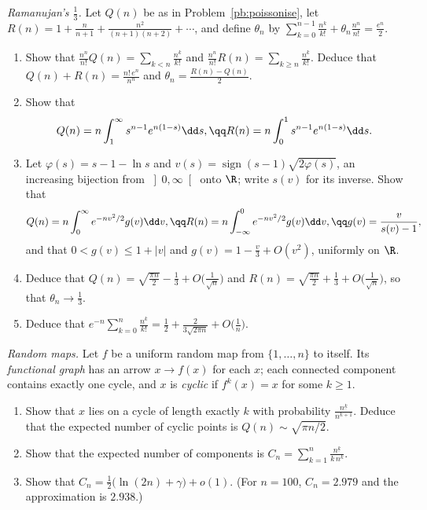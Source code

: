 \begin{exercise}[$\star\star\star$]\label{pb:ramanujan}
\emph{Ramanujan's $\frac13$.} Let $Q(n)$ be as in Problem~\ref{pb:poissonise}, let $R(n)=1+\frac n{n+1}+\frac{n^2}{(n+1)(n+2)}+\cdots$, and define $\theta_n$ by
$\sum_{k=0}^{n-1}\frac{n^k}{k!}+\theta_n\frac{n^n}{n!}=\frac{e^n}2$.
\begin{enumerate}[label=(\alph*)]
\item Show that $\frac{n^n}{n!}Q(n)=\sum_{k<n}\frac{n^k}{k!}$ and $\frac{n^n}{n!}R(n)=\sum_{k\ge n}\frac{n^k}{k!}$. Deduce that $Q(n)+R(n)=\frac{n!\,e^n}{n^n}$ and $\theta_n=\frac{R(n)-Q(n)}2$.
\item Show that
\[
Q(n)=n\int_1^\infty s^{n-1}e^{n(1-s)}\dd s,\qq R(n)=n\int_0^1s^{n-1}e^{n(1-s)}\dd s.
\]
\item Let $\varphi(s)=s-1-\ln s$ and $v(s)=\operatorname{sign}(s-1)\sqrt{2\varphi(s)}$, an increasing bijection from $\left]0,\infty\right[$ onto $\R$; write $s(v)$ for its inverse.
Show that
\[
Q(n)=n\int_0^\infty e^{-nv^2/2}g(v)\dd v,\qq R(n)=n\int_{-\infty}^0e^{-nv^2/2}g(v)\dd v,\qq g(v)=\frac v{s(v)-1},
\]
and that $0<g(v)\le1+|v|$ and $g(v)=1-\frac v3+O(v^2)$, uniformly on $\R$.
\item Deduce that $Q(n)=\sqrt{\frac{\pi n}2}-\frac13+O\bigl(\frac1{\sqrt n}\bigr)$ and $R(n)=\sqrt{\frac{\pi n}2}+\frac13+O\bigl(\frac1{\sqrt n}\bigr)$, so that $\theta_n\to\frac13$.
\item Deduce that $e^{-n}\sum_{k=0}^n\frac{n^k}{k!}=\frac12+\frac2{3\sqrt{2\pi n}}+O\bigl(\frac1n\bigr)$.
\end{enumerate}
\end{exercise}

\begin{exercise}[$\star\star$]\label{pb:mappings}
\emph{Random maps.} Let $f$ be a uniform random map from $\{1,\dots,n\}$ to itself. Its \emph{functional graph} has an arrow $x\to f(x)$ for each $x$;
each connected component contains exactly one cycle, and $x$ is \emph{cyclic} if $f^k(x)=x$ for some $k\ge1$.
\begin{enumerate}[label=(\alph*)]
\item Show that $x$ lies on a cycle of length exactly $k$ with probability $\frac{n^{\underline k}}{n^{k+1}}$. Deduce that the expected number of cyclic points is
$Q(n)\sim\sqrt{\pi n/2}$.
\item Show that the expected number of components is $C_n=\sum_{k=1}^n\frac{n^{\underline k}}{k\,n^k}$.
\item Show that $C_n=\frac12\bigl(\ln(2n)+\gamma\bigr)+o(1)$. (For $n=100$, $C_n=2.979$ and the approximation is $2.938$.)
\end{enumerate}
\end{exercise}

